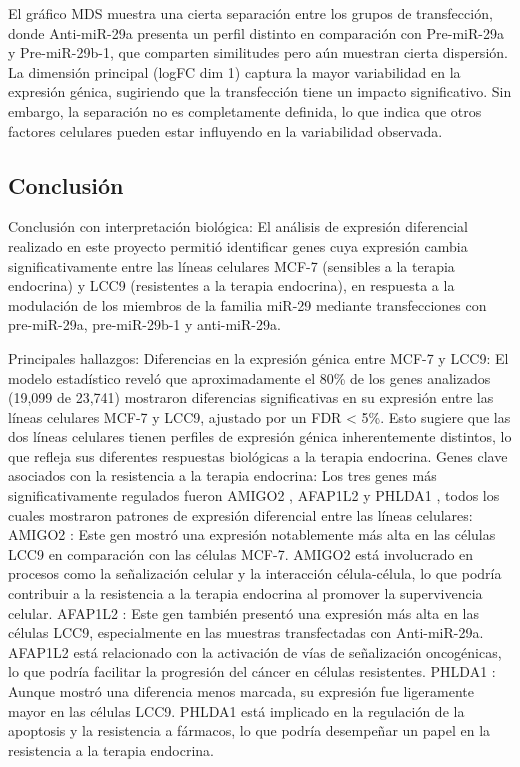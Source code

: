\documentclass[
]{article}
\begin{document}
El gráfico MDS muestra una cierta separación entre los grupos de
transfección, donde Anti-miR-29a presenta un perfil distinto en
comparación con Pre-miR-29a y Pre-miR-29b-1, que comparten similitudes
pero aún muestran cierta dispersión. La dimensión principal (logFC dim
1) captura la mayor variabilidad en la expresión génica, sugiriendo que
la transfección tiene un impacto significativo. Sin embargo, la
separación no es completamente definida, lo que indica que otros
factores celulares pueden estar influyendo en la variabilidad observada.

\subsection{Conclusión}\label{conclusiuxf3n}

Conclusión con interpretación biológica: El análisis de expresión
diferencial realizado en este proyecto permitió identificar genes cuya
expresión cambia significativamente entre las líneas celulares MCF-7
(sensibles a la terapia endocrina) y LCC9 (resistentes a la terapia
endocrina), en respuesta a la modulación de los miembros de la familia
miR-29 mediante transfecciones con pre-miR-29a, pre-miR-29b-1 y
anti-miR-29a.

Principales hallazgos: Diferencias en la expresión génica entre MCF-7 y
LCC9: El modelo estadístico reveló que aproximadamente el 80\% de los
genes analizados (19,099 de 23,741) mostraron diferencias significativas
en su expresión entre las líneas celulares MCF-7 y LCC9, ajustado por un
FDR \textless{} 5\%. Esto sugiere que las dos líneas celulares tienen
perfiles de expresión génica inherentemente distintos, lo que refleja
sus diferentes respuestas biológicas a la terapia endocrina. Genes clave
asociados con la resistencia a la terapia endocrina: Los tres genes más
significativamente regulados fueron AMIGO2 , AFAP1L2 y PHLDA1 , todos
los cuales mostraron patrones de expresión diferencial entre las líneas
celulares: AMIGO2 : Este gen mostró una expresión notablemente más alta
en las células LCC9 en comparación con las células MCF-7. AMIGO2 está
involucrado en procesos como la señalización celular y la interacción
célula-célula, lo que podría contribuir a la resistencia a la terapia
endocrina al promover la supervivencia celular. AFAP1L2 : Este gen
también presentó una expresión más alta en las células LCC9,
especialmente en las muestras transfectadas con Anti-miR-29a. AFAP1L2
está relacionado con la activación de vías de señalización oncogénicas,
lo que podría facilitar la progresión del cáncer en células resistentes.
PHLDA1 : Aunque mostró una diferencia menos marcada, su expresión fue
ligeramente mayor en las células LCC9. PHLDA1 está implicado en la
regulación de la apoptosis y la resistencia a fármacos, lo que podría
desempeñar un papel en la resistencia a la terapia endocrina.
\end{document}
